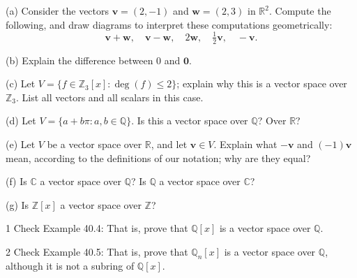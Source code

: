 \begin{problem}[Warmup]{(a)}
    Consider the vectors $\mathbf{v} = (2, -1)$ and $\mathbf{w} = (2, 3)$ in $\mathbb{R}^2$. Compute the following, and draw diagrams to interpret these computations geometrically: \[\mathbf{v} + \mathbf{w}, \quad \mathbf{v} - \mathbf{w}, \quad 2\mathbf{w}, \quad \tfrac{1}{2}\mathbf{v}, \quad -\mathbf{v}.\]
\end{problem}
\unsolved

\begin{problem}[Warmup]{(b)}
    Explain the difference between $0$ and $\mathbf{0}$.
\end{problem}
\unsolved

\begin{problem}[Warmup]{(c)}
    Let $V = \{f \in \mathbb{Z}_3[x] : \deg(f) \le 2\}$; explain why this is a vector space over $\mathbb{Z}_3$. List all vectors and all scalars in this case.
\end{problem}
\unsolved

\begin{problem}[Warmup]{(d)}
    Let $V = \{a + b\pi : a, b \in \mathbb{Q}\}$. Is this a vector space over $\mathbb{Q}$? Over $\mathbb{R}$?
\end{problem}
\unsolved

\begin{problem}[Warmup]{(e)}
    Let $V$ be a vector space over $\mathbb{R}$, and let $\mathbf{v} \in V$. Explain what $-\mathbf{v}$ and $(-1)\mathbf{v}$ mean, according to the definitions of our notation; why are they equal?
\end{problem}
\unsolved

\begin{problem}[Warmup]{(f)}
    Is $\mathbb{C}$ a vector space over $\mathbb{Q}$? Is $\mathbb{Q}$ a vector space over $\mathbb{C}$?
\end{problem}
\unsolved

\begin{problem}[Warmup]{(g)}
    Is $\mathbb{Z}[x]$ a vector space over $\mathbb{Z}$?
\end{problem}
\unsolved

\begin{problem}{1}
    Check Example 40.4: That is, prove that $\mathbb{Q}[x]$ is a vector space over
    $\mathbb{Q}$.
\end{problem}
\unsolved

\begin{problem}{2}
    Check Example 40.5: That is, prove that $\mathbb{Q}_n[x]$ is a vector space over
    $\mathbb{Q}$, although it is not a subring of $\mathbb{Q}[x]$.
\end{problem}
\unsolved

